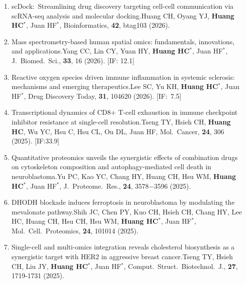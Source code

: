 \documentclass[10pt,a4paper]{article}
\def\mypub#1#2#3{{#1.}\newline #2, #3.}
\begin{document}
\begin{enumerate}
\item
\mypub{
scDock:\ Streamlining drug discovery targeting cell-cell communication via scRNA-seq analysis and molecular docking}
{Huang CH, Oyang YJ, {\bf Huang HC$^*$}, Juan HF$^*$}
{Bioinformatics, {\bf 42}, btag103 (2026)}

\item \mypub{
Mass spectrometry-based human spatial omics: fundamentals, innovations, and applications}
{Yang CC, Lin CY, Yuan HY, {\bf Huang HC$^*$}, Juan HF$^*$}
{J.\ Biomed.\ Sci., {\bf 33}, 16 (2026)}
[IF: 12.1]

\item \mypub{
Reactive oxygen species driven immune inflammation in systemic sclerosis: mechanisms and emerging therapeutics}
{Lee SC, Yu KH, {\bf Huang HC$^*$}, Juan HF$^*$}
{Drug Discovery Today, {\bf 31}, 104620 (2026)}
[IF:~7.5]

\item \mypub{
Transcriptional dynamics of CD8+ T-cell exhaustion in immune checkpoint inhibitor resistance at single-cell resolution}
{Tseng TY, Hsieh CH, {\bf Huang HC}, Wu YC, Hsu C, Hsu CL, Ou DL, Juan HF}
{Mol.\ Cancer, {\bf 24}, 306 (2025)}
[IF:33.9]

\item \mypub{
Quantitative proteomics unveils the synergistic effects of combination drugs on cytoskeleton composition and autophagy-mediated cell death in neuroblastoma}
{Yu PC, Kao YC, Chang HY, Huang CH, Hsu WM, {\bf Huang HC$^*$}, Juan HF$^*$}
{J.\ Proteome.\ Res.,  {\bf 24}, 3578−3596 (2025)}

\item \mypub{
DHODH blockade induces ferroptosis in neuroblastoma by modulating the mevalonate pathway}
{Shih JC, Chen PY, Kuo CH, Hsieh CH, Chang HY, Lee HC, Huang CH, Hsu CH, Hsu WM, {\bf Huang HC$^*$}, Juan HF$^*$}
{Mol.\ Cell.\ Proteomics, {\bf 24}, 101014 (2025)}

\item \mypub{
Single-cell and multi-omics integration reveals cholesterol biosynthesis as a synergistic target with HER2 in aggressive breast cancer}
{Tseng TY, Hsieh CH, Liu JY, {\bf Huang HC$^*$}, Juan HF$^*$}
{Comput.\ Struct.\ Biotechnol.\ J., {\bf 27}, 1719-1731 (2025)}


\end{enumerate}
\end{document}
